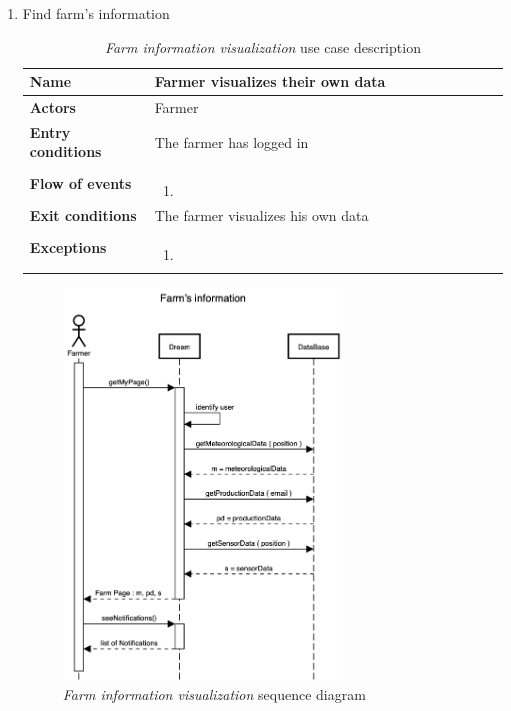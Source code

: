 \begin{enumerate}
    \item Find farm’s information
    \begin{longtable}{p{0.26\linewidth}p{0.75\linewidth}}
        \toprule
        \textbf{Name} & \textbf{Farmer visualizes their own data} \\
        \midrule
        \textbf{Actors} & Farmer \\
        \midrule
        \textbf{Entry conditions} & The farmer has logged in\\
        \midrule
        \textbf{Flow of events} & 
        \begin{enumerate}
            \item 
        \end{enumerate} \\
        \midrule
        \textbf{Exit conditions} & The farmer visualizes his own data\\
        \midrule
        \textbf{Exceptions} & 
        \begin{enumerate}
            \item 
        \end{enumerate}\\
        \bottomrule
        \caption{\emph{Farm information visualization} use case description}
    \end{longtable}
    \begin{figure}[H]
        \begin{center}
        \includegraphics[width=0.7\textwidth]{sequence/FarmInformation.png}
        \caption{\emph{Farm information visualization} sequence diagram}
        \label{fig:sequence5}
        \end{center}
    \end{figure}


\end{enumerate}
